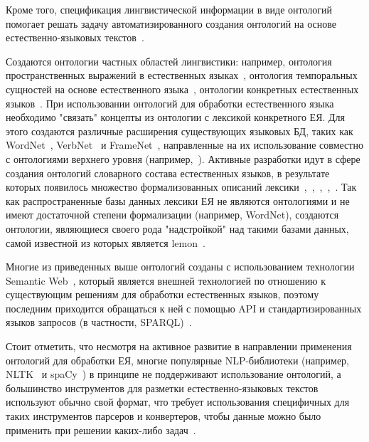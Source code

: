 Кроме того, спецификация лингвистической информации в виде онтологий помогает решать задачу автоматизированного создания онтологий на основе естественно-языковых текстов~\cite{SHAMSFARD200417}.

Создаются онтологии частных областей лингвистики: например, онтология пространственных выражений в естественных языках~\cite{BATEMAN20101027}, онтология темпоральных сущностей на основе естественного языка~\cite{Moens_1987}, онтологии конкретных естественных языков~\cite{Dobrov_2018}.
При использовании онтологий для обработки естественного языка необходимо "связать" концепты из онтологии с лексикой конкретного ЕЯ.
Для этого создаются различные расширения существующих языковых БД, таких как WordNet~\cite{wordnet}, VerbNet~\cite{verbnet} и FrameNet~\cite{framenet}, направленные на их использование совместно с онтологиями верхнего уровня (например,~\cite{pease_fellbaum_2010}).
Активные разработки идут в сфере создания онтологий словарного состава естественных языков, в результате которых появилось множество формализованных описаний лексики~\cite{matsukawa-yokota-1991-development},~\cite{calzolari_1991},~\cite{buitelaar2006linginfo},~\cite{Cimiano2007LexOntoAM},~\cite{buitelaar_2006}.
Так как распространенные базы данных лексики ЕЯ не являются онтологиями и не имеют достаточной степени формализации (например, WordNet), создаются онтологии, являющиеся своего рода "надстройкой" над такими базами данных, самой известной из которых является lemon~\cite{McCrae_2012}.

Многие из приведенных выше онтологий созданы с использованием технологии Semantic Web~\cite{sem_web}, который является внешней технологией по отношению к существующим решениям для обработки естественных языков, поэтому последним приходится обращаться к ней с помощью API и стандартизированных языков запросов (в частности, SPARQL)~\cite{Bouayad_2014}.

Стоит отметить, что несмотря на активное развитие в направлении применения онтологий для обработки ЕЯ, многие популярные NLP-библиотеки (например, NLTK~\cite{nltk} и spaCy~\cite{spacy}) в принципе не поддерживают использование онтологий, а большинство инструментов для разметки естественно-языковых текстов используют обычно свой формат, что требует использования специфичных для таких инструментов парсеров и конвертеров, чтобы данные можно было применить при решении каких-либо задач~\cite[p.~3]{Erekhinskaya2020TenWO}.

